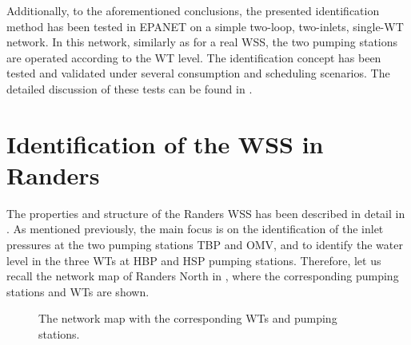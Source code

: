 Additionally, to the aforementioned conclusions, the presented identification method has been tested in EPANET on a simple two-loop, two-inlets, single-WT network. In this network, similarly as for a real WSS, the two pumping stations are operated according to the WT level. The identification concept has been tested and validated under several consumption and scheduling scenarios. The detailed discussion of these tests can be found in . 



\newpage

\section{Identification of the WSS in Randers}
\label{identification_of_the_randers_WSS} 

The properties and structure of the Randers WSS has been described in detail in . As mentioned previously, the main focus is on the identification of the inlet pressures at the two pumping stations TBP and OMV, and to identify the water level in the three WTs at HBP and HSP pumping stations. Therefore, let us recall the network map of Randers North in , where the corresponding pumping stations and WTs are shown.  

\begin{figure}[H]
\centering

\caption{The network map with the corresponding WTs and pumping stations.}
\label{fig:simplified_network_identification1223}
\end{figure}
\vspace{-3mm}

